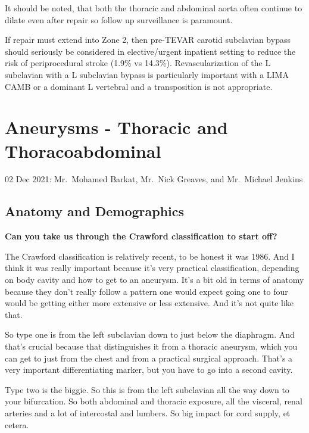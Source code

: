 \documentclass[
]{book}
\begin{document}
It should be noted, that both the thoracic and abdominal aorta often
continue to dilate even after repair so follow up surveillance is
paramount.\citep{famularo2017}

If repair must extend into Zone 2, then pre-TEVAR carotid subclavian
bypass should seriously be considered in elective/urgent inpatient
setting to reduce the risk of periprocedural stroke (1.9\% vs
14.3\%).\citep{bradshaw2017, teixeira2017} Revascularization of the L
subclavian with a L subclavian bypass is particularly important with a
LIMA CAMB or a dominant L vertebral and a transposition is not
appropriate.\citep{morasch2009, matsumura2009}

\hypertarget{aneurysms---thoracic-and-thoracoabdominal}{%
\section{Aneurysms - Thoracic and Thoracoabdominal}\label{aneurysms---thoracic-and-thoracoabdominal}}

02 Dec 2021: Mr.~Mohamed Barkat, Mr.~Nick Greaves, and Mr.~Michael
Jenkins

\hypertarget{anatomy-and-demographics}{%
\subsection{Anatomy and Demographics}\label{anatomy-and-demographics}}

\textbf{Can you take us through the Crawford classification to start off?}

The Crawford classification is relatively recent, to be honest it was
1986.\citep{crawford1986} And I think it was really important because it's
very practical classification, depending on body cavity and how to get
to an aneurysm. It's a bit old in terms of anatomy because they don't
really follow a pattern one would expect going one to four would be
getting either more extensive or less extensive. And it's not quite like
that.

So type one is from the left subclavian down to just below the
diaphragm. And that's crucial because that distinguishes it from a
thoracic aneurysm, which you can get to just from the chest and from a
practical surgical approach. That's a very important differentiating
marker, but you have to go into a second cavity.

Type two is the biggie. So this is from the left subclavian all the way
down to your bifurcation. So both abdominal and thoracic exposure, all
the visceral, renal arteries and a lot of intercostal and lumbers. So
big impact for cord supply, et cetera.
\end{document}
